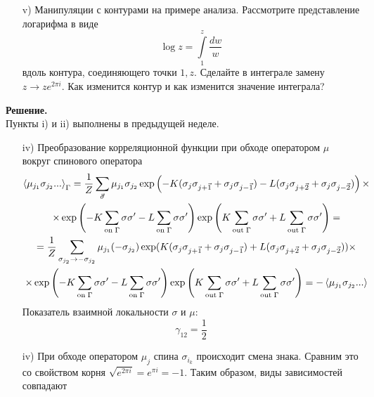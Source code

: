 \documentclass[12pt]{article}
\theoremstyle{definition}
\begin{document}
\begin{enumerate}
\begin{itemize}
        \item[v)] Манипуляции с контурами на примере анализа. Рассмотрите представление логарифма в виде
        \begin{equation}
            \log z=\int\limits_1^z\frac{dw}{w}
        \end{equation}
        вдоль контура, соединяющего точки $1, z$. Сделайте в интеграле замену $z\rightarrow ze^{2\pi i}$. Как изменится контур и как изменится значение интеграла?
    \end{itemize}
    \textbf{Решение.}\\
    Пункты i) и ii) выполнены в предыдущей неделе.
    \begin{itemize}
        \item[iv)] Преобразование корреляционной функции при обходе оператором $\mu$ вокруг спинового оператора
        \begin{multline}
            \braket{\mu_{j_1}\sigma_{j_2}...}_\Gamma=\frac{1}{Z}\sum\limits_{\vec{\sigma}}\mu_{j_1}\sigma_{j_2}\exp\left(-K(\sigma_j\sigma_{j+\vec{1}}+\sigma_j\sigma_{j-\vec{1}})-L(\sigma_j\sigma_{j+\vec{2}}+\sigma_j\sigma_{j-\vec{2}})\right)\times\\\times\exp\left(-K\sum\limits_{\text{on}\;\Gamma}\sigma\sigma'-L\sum\limits_{\text{on}\;\Gamma}\sigma\sigma'\right)\exp\left(K\sum\limits_{\text{out}\;\Gamma}\sigma\sigma'+L\sum\limits_{\text{out}\;\Gamma}\sigma\sigma'\right)=\\=\frac{1}{Z}\sum\limits_{\sigma_{j_2}\rightarrow-\sigma_{j_2}}\mu_{j_1}(-\sigma_{j_2})\exp(K(\sigma_j\sigma_{j+\vec{1}}+\sigma_j\sigma_{j-\vec{1}})+L(\sigma_j\sigma_{j+\vec{2}}+\sigma_j\sigma_{j-\vec{2}}))\times\\\times\exp\left(-K\sum\limits_{\text{on}\;\Gamma}\sigma\sigma'-L\sum\limits_{\text{on}\;\Gamma}\sigma\sigma'\right)\exp\left(K\sum\limits_{\text{out}\;\Gamma}\sigma\sigma'+L\sum\limits_{\text{out}\;\Gamma}\sigma\sigma'\right)=-\braket{\mu_{j_1}\sigma_{j_2}...}
        \end{multline}
        Показатель взаимной локальности $\sigma$ и $\mu$:
        \begin{equation}
            \boxed{\gamma_{12}=\frac{1}{2}}
        \end{equation}
        \item[iv)] При обходе оператором $\mu_j$ спина $\sigma_{i_k}$ происходит смена знака. Сравним это со свойством корня $\sqrt{e^{2\pi i}}=e^{\pi i}=-1$. Таким образом, виды зависимостей совпадают
        \begin{equation}

\end{equation}
\end{itemize}
\end{enumerate}
\end{document}
